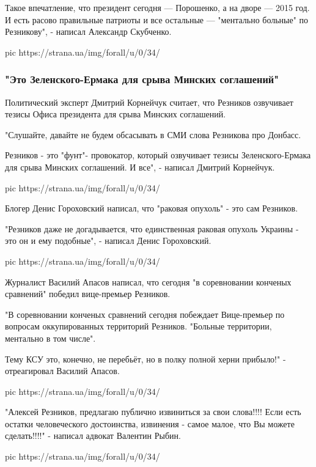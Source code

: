 Такое впечатление, что президент сегодня — Порошенко, а на дворе — 2015 год. И
есть расово правильные патриоты и все остальные — "ментально больные" по
Резникову", - написал Александр Скубченко.

\ifcmt
pic https://strana.ua/img/forall/u/0/34/%
\fi 

\subsubsection{"Это Зеленского-Ермака для срыва Минских соглашений"}

Политический эксперт Дмитрий Корнейчук считает, что Резников озвучивает тезисы
Офиса президента для срыва Минских соглашений.

"Слушайте, давайте не будем обсасывать в СМИ слова Резникова про Донбасс.

Резников - это "фунт"- провокатор, который озвучивает тезисы Зеленского-Ермака
для срыва Минских соглашений. И все", - написал Дмитрий Корнейчук.

\ifcmt
pic https://strana.ua/img/forall/u/0/34/%
\fi

Блогер Денис Гороховский написал, что "раковая опухоль" - это сам Резников.

"Резников даже не догадывается, что единственная раковая опухоль Украины - это
он и ему подобные", - написал Денис Гороховский.

\ifcmt
pic https://strana.ua/img/forall/u/0/34/%
\fi

Журналист Василий Апасов написал, что сегодня "в соревновании конченых
сравнений" победил вице-премьер Резников.

"В соревновании конченых сравнений сегодня побеждает Вице-премьер по вопросам
оккупированных территорий Резников. "Больные территории, ментально в том
числе".

Тему КСУ это, конечно, не перебьёт, но в полку полной херни прибыло!" -
отреагировал Василий Апасов.

\ifcmt
pic https://strana.ua/img/forall/u/0/34/%
\fi

"Алексей Резников, предлагаю публично извиниться за свои слова!!!! Если есть
остатки человеческого достоинства, извинения - самое малое, что Вы можете
сделать!!!!" - написал адвокат Валентин Рыбин.

\ifcmt
pic https://strana.ua/img/forall/u/0/34/%
\fi

